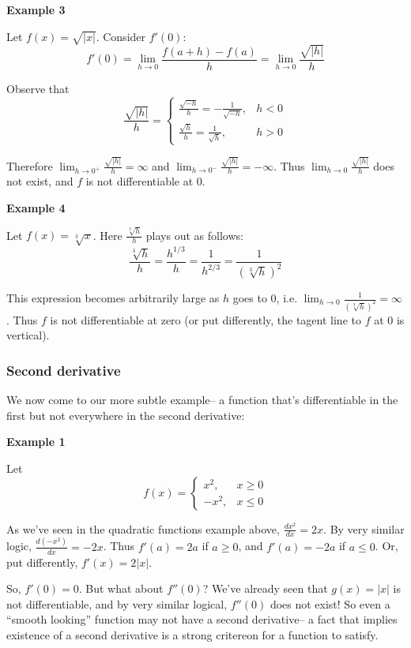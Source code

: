 \vs

\textbf{Example 3}

Let $f(x)=\sqrt{|x|}$. Consider $f'(0)$:
\[f'(0)=\lim_{h\to0}\frac{f(a+h)-f(a)}{h}=\lim_{h\to0}\frac{\sqrt{|h|}}{h}\]

Observe that
\[\frac{\sqrt{|h|}}{h}=\begin{cases}
  \frac{\sqrt{-h}}{h}=-\frac{1}{\sqrt{-h}},&h<0\\
  \frac{\sqrt{h}}{h}=\frac{1}{\sqrt{h}},&h>0
\end{cases}\]

Therefore $\lim_{h\to0^+}\frac{\sqrt{|h|}}{h}=\infty$ and
$\lim_{h\to0^-}\frac{\sqrt{|h|}}{h}=-\infty$. Thus
$\lim_{h\to0}\frac{\sqrt{|h|}}{h}$ does not exist, and $f$ is not
differentiable at $0$.

\vs

\textbf{Example 4}

Let $f(x)=\sqrt[3]{x}$. Here $\frac{\sqrt[3]{h}}{h}$ plays out as
follows:
\[\frac{\sqrt[3]{h}}{h}=\frac{h^{1/3}}{h}=\frac{1}{h^{2/3}}=\frac{1}{{(\sqrt[3]{h})}^2}\]

This expression becomes arbitrarily large as $h$ goes to $0$, i.e.
$\lim_{h\to0}\frac{1}{{(\sqrt[3]{h})}^2}=\infty$. Thus $f$ is not
differentiable at zero (or put differently, the tagent line to $f$ at
$0$ is vertical).


\subsubsection*{Second derivative}
We now come to our more subtle example-- a function that's
differentiable in the first but not everywhere in the second
derivative:

\vs

\textbf{Example 1}

Let
\[f(x)=\begin{cases}
  x^2,&x\geq0\\
  -x^2,&x\leq0
\end{cases}\]

As we've seen in the quadratic functions example above,
$\frac{dx^2}{dx}=2x$. By very similar logic, $\frac{d(-x^2)}{dx}=-2x$.
Thus $f'(a)=2a$ if $a\geq0$, and $f'(a)=-2a$ if $a\leq0$. Or, put
differently, $f'(x)=2|x|$.

\vs

So, $f'(0)=0$. But what about $f''(0)$? We've already seen that
$g(x)=|x|$ is not differentiable, and by very similar logical,
$f''(0)$ does not exist! So even a ``smooth looking'' function may not
have a second derivative-- a fact that implies existence of a second
derivative is a strong critereon for a function to satisfy.

